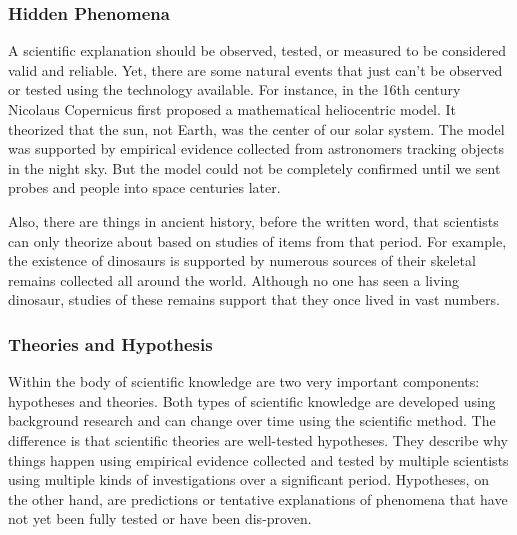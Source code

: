 \subsubsection*{Hidden Phenomena}

A scientific explanation should be observed, tested, or measured to be
considered valid and reliable. Yet, there are some natural events that just
can't be observed or tested using the technology available. For instance, in
the 16th century Nicolaus Copernicus first proposed a mathematical heliocentric
model. It theorized that the sun, not Earth, was the center of our solar
system. The model was supported by empirical evidence collected from
astronomers tracking objects in the night sky. But the model could not be
completely confirmed until we sent probes and people into space centuries
later.

Also, there are things in ancient history, before the written word, that
scientists can only theorize about based on studies of items from that period.
For example, the existence of dinosaurs is supported by numerous sources of
their skeletal remains collected all around the world. Although no one has seen
a living dinosaur, studies of these remains support that they once lived in
vast numbers.

\subsubsection*{Theories and Hypothesis}

Within the body of scientific knowledge are two very important components:
hypotheses and theories. Both types of scientific knowledge are developed using
background research and can change over time using the scientific method. The
difference is that scientific theories are well-tested hypotheses. They
describe why things happen using empirical evidence collected and tested by
multiple scientists using multiple kinds of investigations over a significant
period. Hypotheses, on the other hand, are predictions or tentative
explanations of phenomena that have not yet been fully tested or have been
dis-proven.

\newpage
